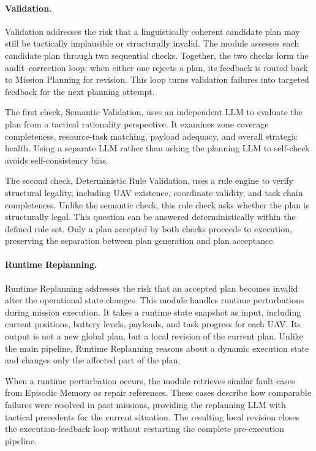 \paragraph{Validation.} Validation addresses the risk that a linguistically
coherent candidate plan may still be tactically implausible or structurally
invalid. The module assesses each candidate plan through two sequential checks.
Together, the two checks form the audit--correction loop: when either one
rejects a plan, its feedback is routed back to Mission Planning for revision.
This loop turns validation failures into targeted feedback for the next
planning attempt.

The first check, Semantic Validation, uses an independent LLM to evaluate the plan
from a tactical rationality perspective. It examines zone coverage completeness,
resource-task matching, payload adequacy, and overall strategic health.
Using a separate LLM rather than asking the planning LLM to self-check
avoids self-consistency bias.

The second check, Deterministic Rule Validation, uses a rule engine to verify
structural legality, including UAV existence, coordinate validity, and task chain
completeness. Unlike the semantic check, this rule check asks whether the plan
is structurally legal.
This question can be answered deterministically within the defined rule set.
Only a plan accepted by both checks proceeds to execution, preserving the
separation between plan generation and plan acceptance.


\paragraph{Runtime Replanning.} Runtime Replanning addresses the risk that an
accepted plan becomes invalid after the operational state changes. This module
handles runtime perturbations during mission execution.
It takes a runtime state snapshot as input, including current positions, battery levels,
payloads, and task progress for each UAV.
Its output is not a new global plan, but a local revision of the current plan.
Unlike the main pipeline, Runtime Replanning reasons about a dynamic execution state and
changes only the affected part of the plan.

When a runtime perturbation occurs, the module retrieves similar fault cases
from Episodic Memory as repair references.
These cases describe how comparable failures were resolved in past missions,
providing the replanning LLM with tactical precedents for the current situation.
The resulting local revision closes the execution-feedback loop without
restarting the complete pre-execution pipeline.

